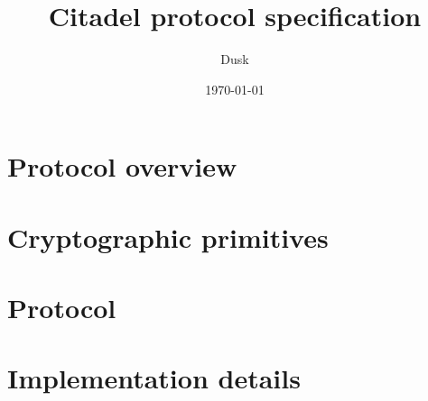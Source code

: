 \documentclass{article}
\title{Citadel protocol specification}
\author{Dusk}
\date{\today}
\begin{document}
	
\maketitle
\vspace{0.6cm}

\tableofcontents

\newpage

\section{Protocol overview}
\label{sec:general-overview}


\vspace{0.5cm}
\section{Cryptographic primitives}
\label{sec:crypto-primitives}


\section{Protocol}
\label{sec:protocol}


\pagebreak
\section{Implementation details}
\label{sec:implementation}


%
%
%



\end{document}
